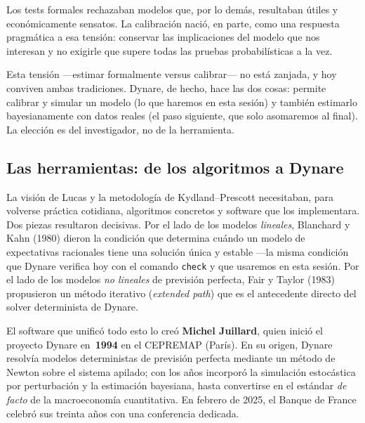 \documentclass[11pt,a4paper]{report}
\newcounter{tcbrem}[section]
\renewcommand{\thetcbrem}{\thesection.\arabic{tcbrem}}
\newenvironment{remark}{%
  \refstepcounter{tcbrem}%
  \begin{tcolorbox}[remarkstyle, title={Observación~\thetcbrem}]}%
{\end{tcolorbox}}
\newcommand{\code}[1]{\texttt{#1}}
\begin{document}
\noindent Los tests formales rechazaban modelos que, por lo demás, resultaban
útiles y económicamente sensatos. La calibración nació, en parte, como una
respuesta pragmática a esa tensión: conservar las implicaciones del modelo que
nos interesan y no exigirle que supere todas las pruebas probabilísticas a la
vez.

\begin{remark}
Esta tensión ---estimar formalmente versus calibrar--- no está zanjada, y hoy
conviven ambas tradiciones. Dynare, de hecho, hace las dos cosas: permite
calibrar y simular un modelo (lo que haremos en esta sesión) y también
estimarlo bayesianamente con datos reales (el paso siguiente, que solo
asomaremos al final). La elección es del investigador, no de la herramienta.
\end{remark}

\subsection{Las herramientas: de los algoritmos a Dynare}

La visión de Lucas y la metodología de Kydland--Prescott necesitaban, para
volverse práctica cotidiana, algoritmos concretos y software que los
implementara. Dos piezas resultaron decisivas. Por el lado de los modelos
\emph{lineales}, Blanchard y Kahn (1980) dieron la condición que determina
cuándo un modelo de expectativas racionales tiene una solución única y estable
---la misma condición que Dynare verifica hoy con el comando \code{check} y que
usaremos en esta sesión. Por el lado de los modelos \emph{no lineales} de
previsión perfecta, Fair y Taylor (1983) propusieron un método iterativo
(\emph{extended path}) que es el antecedente directo del solver determinista de
Dynare.

El software que unificó todo esto lo creó \textbf{Michel Juillard}, quien
inició el proyecto Dynare en~\textbf{1994} en el CEPREMAP (París). En su origen,
Dynare resolvía modelos deterministas de previsión perfecta mediante un método
de Newton sobre el sistema apilado; con los años incorporó la simulación
estocástica por perturbación y la estimación bayesiana, hasta convertirse en el
estándar \emph{de facto} de la macroeconomía cuantitativa. En febrero de 2025,
el Banque de France celebró sus treinta años con una conferencia dedicada.
\end{document}
